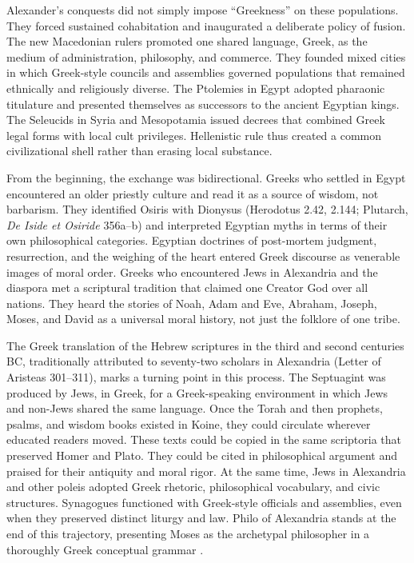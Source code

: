 Alexander's conquests did not simply impose ``Greekness'' on these populations.
They forced sustained cohabitation and inaugurated a deliberate policy of fusion.
The new Macedonian rulers promoted one shared language, Greek, as the medium of administration, philosophy, and commerce.
They founded mixed cities in which Greek-style councils and assemblies governed populations that remained ethnically and religiously diverse.
The Ptolemies in Egypt adopted pharaonic titulature and presented themselves as successors to the ancient Egyptian kings.
The Seleucids in Syria and Mesopotamia issued decrees that combined Greek legal forms with local cult privileges.
Hellenistic rule thus created a common civilizational shell rather than erasing local substance.

From the beginning, the exchange was bidirectional.
Greeks who settled in Egypt encountered an older priestly culture and read it as a source of wisdom, not barbarism.
They identified Osiris with Dionysus (Herodotus 2.42, 2.144; Plutarch, \emph{De Iside et Osiride} 356a--b) and interpreted Egyptian myths in terms of their own philosophical categories.
Egyptian doctrines of post-mortem judgment, resurrection, and the weighing of the heart entered Greek discourse as venerable images of moral order.
Greeks who encountered Jews in Alexandria and the diaspora met a scriptural tradition that claimed one Creator God over all nations.
They heard the stories of Noah, Adam and Eve, Abraham, Joseph, Moses, and David as a universal moral history, not just the folklore of one tribe.

The Greek translation of the Hebrew scriptures in the third and second centuries BC, traditionally attributed to seventy-two scholars in Alexandria (Letter of Aristeas 301--311), marks a turning point in this process.
The Septuagint was produced by Jews, in Greek, for a Greek-speaking environment in which Jews and non-Jews shared the same language.
Once the Torah and then prophets, psalms, and wisdom books existed in Koine, they could circulate wherever educated readers moved.
These texts could be copied in the same scriptoria that preserved Homer and Plato.
They could be cited in philosophical argument and praised for their antiquity and moral rigor.
At the same time, Jews in Alexandria and other poleis adopted Greek rhetoric, philosophical vocabulary, and civic structures.
Synagogues functioned with Greek-style officials and assemblies, even when they preserved distinct liturgy and law.
Philo of Alexandria stands at the end of this trajectory, presenting Moses as the archetypal philosopher in a thoroughly Greek conceptual grammar \cite{philo:vimoysis}.

